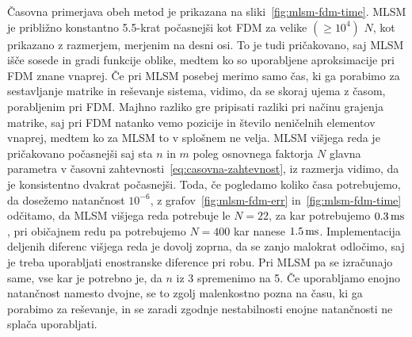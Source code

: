 \documentclass[12pt,a4paper,twoside]{article}
\theoremstyle{definition} %
\theoremstyle{plain} %
\numberwithin{equation}{section}
\begin{document}
Časovna primerjava obeh metod je prikazana na sliki~\ref{fig:mlsm-fdm-time}.  MLSM je približno
konstantno 5.5-krat počasnejši kot FDM za velike $(\geq 10^4)$ $N$, kot prikazano z razmerjem,
merjenim na desni osi. To je tudi pričakovano, saj MLSM išče sosede in gradi funkcije oblike, medtem
ko so uporabljene aproksimacije pri FDM znane vnaprej. Če pri MLSM posebej merimo samo čas, ki ga
porabimo za sestavljanje matrike in reševanje sistema, vidimo, da se skoraj ujema z časom,
porabljenim pri FDM. Majhno razliko gre pripisati razliki pri načinu grajenja matrike, saj pri
FDM natanko vemo pozicije in število neničelnih elementov vnaprej, medtem ko za MLSM to v splošnem
ne velja. MLSM višjega reda je pričakovano počasnejši saj sta $n$ in $m$ poleg osnovnega faktorja
$N$ glavna parametra v časovni zahtevnosti~\eqref{eq:casovna-zahtevnost}, iz razmerja vidimo, da je
konsistentno dvakrat počasnejši. Toda, če pogledamo koliko časa potrebujemo, da dosežemo natančnost
$10^{-6}$, z grafov~\ref{fig:mlsm-fdm-err} in~\ref{fig:mlsm-fdm-time} odčitamo, da MLSM višjega reda
potrebuje le $N = 22$, za kar potrebujemo $\unit[0.3]{ms}$, pri običajnem redu pa potrebujemo $N =
400$ kar nanese $\unit[1.5]{ms}$. Implementacija deljenih diferenc višjega reda je dovolj zoprna, da
se zanjo malokrat odločimo, saj je treba uporabljati enostranske diference pri robu. Pri MLSM pa se
izračunajo same, vse kar je potrebno je, da $n$ iz 3 spremenimo na 5. Če uporabljamo enojno
natančnost namesto dvojne, se to zgolj malenkostno pozna na času, ki ga porabimo za reševanje, in se
zaradi zgodnje nestabilnosti enojne natančnosti ne splača uporabljati.
\end{document}
